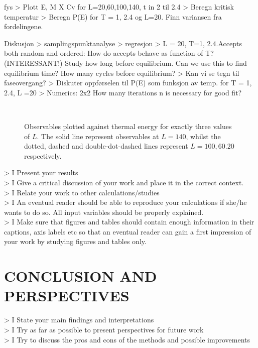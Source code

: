 \documentclass[11pt,english,a4paper]{article}
\begin{document}
fys
> Plott E, M X Cv for L=20,60,100,140, t in 2 til 2.4
> Beregn kritisk temperatur
> Beregn P(E) for T = 1, 2.4 og L=20. Finn variansen fra fordelingene. 

Diskusjon
> samplingspunktanalyse
> regresjon
> L = 20, T=1, 2.4.Accepts both random and ordered: How do accepts behave as function of T? (INTERESSANT!) Study how long before equilibrium. Can we use this to find equilibrium time?  How many cycles before equilibrium?
> Kan vi se tegn til faseovergang?
> Diskuter oppførselen til P(E) som funksjon av temp. for T = 1, 2.4, L =20
> Numerics: 2x2 How many iterations n is necessary for good fit? 




\begin{figure}
\center
\\

\caption{Observables plotted against thermal energy for exactly three values of $L$. The solid line represent observables at $L=140$, whilst the dotted, dashed and double-dot-dashed lines represent $L = 100,60.20$ respectively.} \label{fig:observables}
\end{figure}





> I Present your results\\
> I Give a critical discussion of your work and place it in the correct context.\\
> I Relate your work to other calculations/studies\\
> I An eventual reader should be able to reproduce your calculations if she/he wants to do so. All input variables should be properly explained.\\
> I Make sure that figures and tables should contain enough information in their captions, axis labels etc so that an eventual reader can gain a first impression of your work by studying figures and tables only.
\section*{\uppercase{Conclusion and perspectives}}
> I State your main findings and interpretations\\
> I Try as far as possible to present perspectives for future work\\
> I Try to discuss the pros and cons of the methods and possible improvements

\printbibliography
\end{document}
